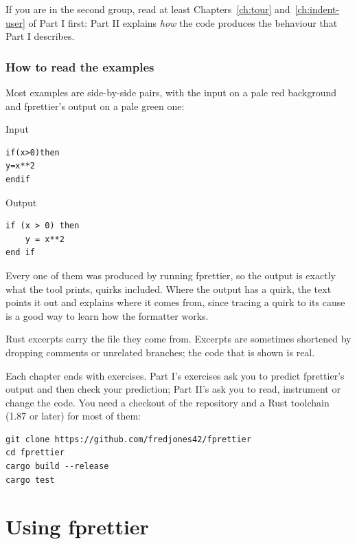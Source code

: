 \documentclass[11pt,a4paper,openany]{book}
\newenvironment{beforecol}{\noindent\begin{minipage}[t]{0.485\linewidth}\textsf{\footnotesize\color{commentc}Input}}{\end{minipage}\hfill}
\newenvironment{aftercol}{\begin{minipage}[t]{0.485\linewidth}\textsf{\footnotesize\color{commentc}Output}}{\end{minipage}\par\medskip}
\newcounter{exercise}[chapter]
\begin{document}
If you are in the second group, read at least Chapters~\ref{ch:tour}
and~\ref{ch:indent-user} of Part I first: Part II explains \emph{how} the code
produces the behaviour that Part I describes.

\section*{How to read the examples}

Most examples are side-by-side pairs, with the input on a pale red background
and fprettier's output on a pale green one:

\begin{beforecol}
\begin{lstlisting}[style=before]
if(x>0)then
y=x**2
endif
\end{lstlisting}
\end{beforecol}
\begin{aftercol}
\begin{lstlisting}[style=after]
if (x > 0) then
    y = x**2
end if
\end{lstlisting}
\end{aftercol}

Every one of them was produced by running fprettier, so the output is exactly
what the tool prints, quirks included. Where the output has a quirk, the text
points it out and explains where it comes from, since tracing a quirk to its
cause is a good way to learn how the formatter works.

Rust excerpts carry the file they come from. Excerpts are sometimes shortened by
dropping comments or unrelated branches; the code that is shown is real.

Each chapter ends with exercises. Part I's exercises ask you to predict
fprettier's output and then check your prediction; Part II's ask you to read,
instrument or change the code. You need a checkout of the repository and a
Rust toolchain (1.87 or later) for most of them:

\begin{lstlisting}[style=shell]
git clone https://github.com/fredjones42/fprettier
cd fprettier
cargo build --release
cargo test
\end{lstlisting}

\mainmatter
\part{Using fprettier}
\end{document}
